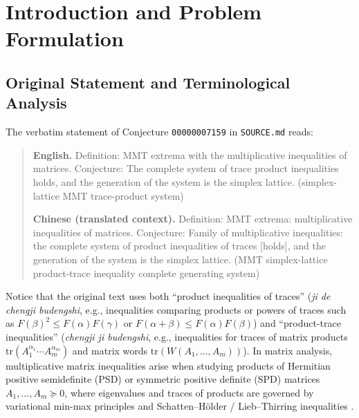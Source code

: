 \documentclass[11pt,a4paper]{article}
\theoremstyle{definition}
\theoremstyle{remark}
\newcommand{\tr}{\mathrm{tr}}
\begin{document}
\section{Introduction and Problem Formulation}

\subsection{Original Statement and Terminological Analysis}

The verbatim statement of Conjecture \texttt{00000007159} in \texttt{SOURCE.md} reads:
\begin{quote}
\textbf{English.} Definition: MMT extrema with the multiplicative inequalities of matrices. Conjecture: The complete system of trace product inequalities holds, and the generation of the system is the simplex lattice. (simplex-lattice MMT trace-product system)

\textbf{Chinese (translated context).} Definition: MMT extrema: multiplicative inequalities of matrices. Conjecture: Family of multiplicative inequalities: the complete system of product inequalities of traces [holds], and the generation of the system is the simplex lattice. (MMT simplex-lattice product-trace inequality complete generating system)
\end{quote}

Notice that the original text uses both ``product inequalities of traces'' (\emph{ji de chengji budengshi}, e.g., inequalities comparing products or powers of traces such as $F(\beta)^2 \le F(\alpha)F(\gamma)$ or $F(\alpha+\beta) \le F(\alpha)F(\beta)$) and ``product-trace inequalities'' (\emph{chengji ji budengshi}, e.g., inequalities for traces of matrix products $\tr(A_1^{\alpha_1}\cdots A_m^{\alpha_m})$ and matrix words $\tr(W(A_1,\dots,A_m))$). In matrix analysis, multiplicative matrix inequalities arise when studying products of Hermitian positive semidefinite (PSD) or symmetric positive definite (SPD) matrices $A_1,\dots,A_m \succeq 0$, where eigenvalues and traces of products are governed by variational min-max principles and Schatten--H\"older / Lieb--Thirring inequalities \cite{Bhatia1997,HornJohnson1991,LiebThirring1976}.
\end{document}
